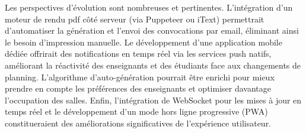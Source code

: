 Les perspectives d'évolution sont nombreuses et pertinentes. L'intégration d'un moteur de rendu \acrshort{pdf} côté serveur (via Puppeteer ou iText) permettrait d'automatiser la génération et l'envoi des convocations par email, éliminant ainsi le besoin d'impression manuelle. Le développement d'une application mobile dédiée offrirait des notifications en temps réel via les services push natifs, améliorant la réactivité des enseignants et des étudiants face aux changements de planning. L'algorithme d'auto-génération pourrait être enrichi pour mieux prendre en compte les préférences des enseignants et optimiser davantage l'occupation des salles. Enfin, l'intégration de WebSocket pour les mises à jour en temps réel et le développement d'un mode hors ligne progressive (PWA) constitueraient des améliorations significatives de l'expérience utilisateur.

